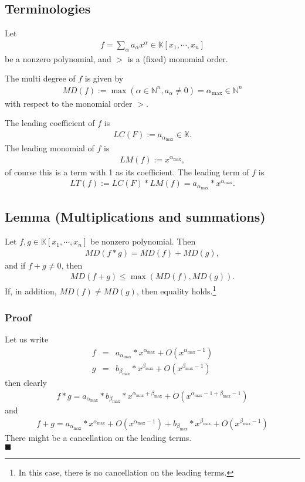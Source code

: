 \documentclass[11pt]{book}
\begin{document}
\subsection{Terminologies}
Let 
\begin{eqnarray}
f = \sum_{\alpha} a_\alpha x^\alpha \in \mathbb{K}[x_1, \cdots, x_n]
\end{eqnarray}
be a nonzero polynomial, and $>$ is a (fixed) monomial order.

The multi degree of $f$ is given by
\begin{eqnarray}
\label{multiDegree}
MD(f) := \max \left( \alpha \in \mathbb{N}^n, a_\alpha \neq 0 \right) = \alpha_{\max} \in \mathbb{N}^n
\end{eqnarray}
with respect to the monomial order $>$.

The leading coefficient of $f$ is
\begin{eqnarray}
LC(F) := a_{\alpha_{\max}} \in \mathbb{K}.
\end{eqnarray}
The leading monomial of $f$ is
\begin{eqnarray}
LM(f) := x^{\alpha_{\max}},
\end{eqnarray}
of course this is a term with 1 as its coefficient.
The leading term of $f$ is
\begin{eqnarray}
LT(f) := LC(F) * LM(f) = a_{\alpha_{\max}} * x^{\alpha_{\max}}.
\end{eqnarray}

\subsection{Lemma (Multiplications and summations)}
\label{multiplication}
Let $f, g \in \mathbb{K}[x_1, \cdots, x_n]$ be nonzero polynomial.
Then
\begin{eqnarray}
MD(f * g) = MD(f) + MD(g),
\end{eqnarray}
and if $f+g \neq 0$, then
\begin{eqnarray}
MD(f+g) \leq \max(MD(f), MD(g)).
\end{eqnarray}
If, in addition, $MD(f) \neq MD(g)$, then equality holds.\footnote{In this case, there is no cancellation on the leading terms.}

\subsubsection{Proof}
Let us write
\begin{eqnarray}
f &=& a_{\alpha_{\max}} * x^{\alpha_{\max}} + O(x^{\alpha_{\max}-1}) \\
g &=& b_{\beta_{\max}} * x^{\beta_{\max}} + O(x^{\beta_{\max}-1})
\end{eqnarray}
then clearly
\begin{eqnarray}
f*g = a_{\alpha_{\max}} * b_{\beta_{\max}} * x^{\alpha_{\max}+\beta_{\max}} + O(x^{\alpha_{\max}-1+\beta_{\max} -1})
\end{eqnarray}
and
\begin{eqnarray}
f + g =  a_{\alpha_{\max}} * x^{\alpha_{\max}} + O(x^{\alpha_{\max}-1}) + b_{\beta_{\max}} * x^{\beta_{\max}} + O(x^{\beta_{\max}-1}) 
\end{eqnarray}
There might be a cancellation on the leading terms.\\
$\blacksquare$
\end{document}

